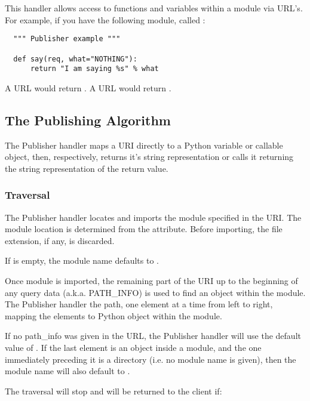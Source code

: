This handler allows access to functions and variables within a module
via URL's. For example, if you have the following module, called 
:

\begin{verbatim}
  """ Publisher example """

  def say(req, what="NOTHING"):
      return "I am saying %s" % what

\end{verbatim}

A URL  would return 
. A URL 
 would
return .

\subsection{The Publishing Algorithm\label{hand-pub-alg}}

The Publisher handler maps a URI directly to a Python variable or
callable object, then, respectively, returns it's string
representation or calls it returning the string representation of the
return value.

\subsubsection{Traversal\label{hand-pub-alg-trav}}

The Publisher handler locates and imports the module specified in the
URI. The module location is determined from the 
attribute. Before importing, the file extension, if any, is
discarded. 

If  is empty, the module name defaults to
.

Once module is imported, the remaining part of the URI up to the
beginning of any query data (a.k.a. PATH_INFO) is used to find an
object within the module. The Publisher handler  the 
path, one element at a time from left to right, mapping the elements
to Python object within the module.

If no path_info was given in the URL, the Publisher handler will use
the default value of . If the last element is an object inside
a module, and the one immediately preceding it is a directory
(i.e. no module name is given), then the module name will also default
to .

The traversal will stop and  will be returned to
the client if:

